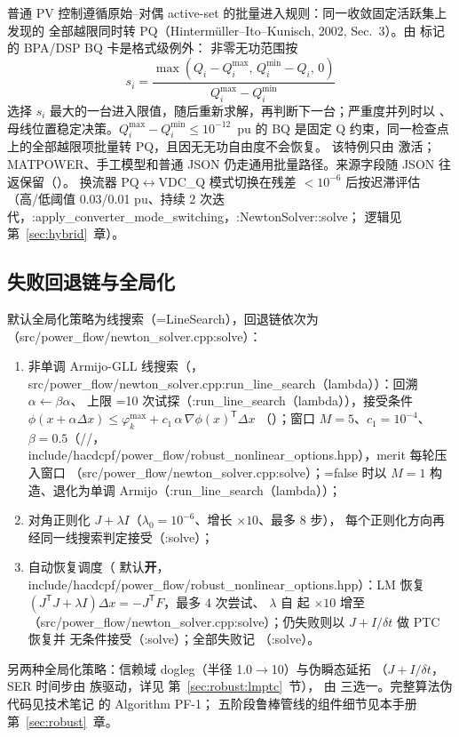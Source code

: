 普通 PV 控制遵循原始--对偶 active-set 的批量进入规则：同一收敛固定活跃集上发现的
全部越限同时转 PQ（Hinterm\"uller--Ito--Kunisch, 2002, Sec.~3）。由
 标记的 BPA/DSP BQ 卡是格式级例外：
非零无功范围按
\[
 s_i=\frac{\max(Q_i-Q_i^{\max},\,Q_i^{\min}-Q_i,\,0)}
 {Q_i^{\max}-Q_i^{\min}}
\]
选择 $s_i$ 最大的一台进入限值，随后重新求解，再判断下一台；严重度并列时以
、母线位置稳定决策。$Q_i^{\max}-Q_i^{\min}\le10^{-12}$~pu
的 BQ 是固定 Q 约束，同一检查点上的全部越限项批量转 PQ，且因无无功自由度不会恢复。
该特例只由  激活；MATPOWER、手工模型和普通 JSON
仍走通用批量路径。来源字段随 JSON 往返保留（）。
换流器 PQ$\leftrightarrow$VDC\_Q 模式切换在残差 $<10^{-6}$ 后按迟滞评估
（高/低阈值 0.03/0.01 pu、持续 2 次迭代，:apply\_converter\_mode\_switching，:NewtonSolver::solve；
逻辑见第~\ref{sec:hybrid}~章）。

\subsection{失败回退链与全局化}
默认全局化策略为线搜索（=LineSearch），回退链依次为
（src/power\_flow/newton\_solver.cpp:solve）：
\begin{enumerate}
  \item 非单调 Armijo-GLL 线搜索（，
        src/power\_flow/newton\_solver.cpp:run\_line\_search（lambda））：回溯 $\alpha\leftarrow\beta\alpha$、
        上限 =10 次试探（:run\_line\_search（lambda）），接受条件
        $\phi(x+\alpha\Delta x)\le\varphi_k^{\max}+c_1\,\alpha\,\nabla\phi(x)^{\mathsf T}\Delta x$
        （）；窗口 $M=5$、$c_1=10^{-4}$、
        $\beta=0.5$（//，
        include/hacdcpf/power\_flow/robust\_nonlinear\_options.hpp），merit 每轮压入窗口
        （src/power\_flow/newton\_solver.cpp:solve）；=false
        时以 $M=1$ 构造、退化为单调 Armijo（:run\_line\_search（lambda））；
  \item 对角正则化 $J+\lambda I$（$\lambda_0=10^{-6}$、增长 $\times10$、最多 8 步），
        每个正则化方向再经同一线搜索判定接受（:solve）；
  \item 自动恢复调度（ 默认\textbf{开}，
        include/hacdcpf/power\_flow/robust\_nonlinear\_options.hpp）：LM 恢复
        $(J^{\mathsf T}J+\lambda I)\Delta x=-J^{\mathsf T}F$，最多 4 次尝试、
        $\lambda$ 自  起 $\times10$ 增至 
        （src/power\_flow/newton\_solver.cpp:solve）；仍失败则以 $J+I/\delta t$ 做 PTC 恢复并
        无条件接受（:solve）；全部失败记 （:solve）。
\end{enumerate}
另两种全局化策略：信赖域 dogleg（半径 1.0$\to$10）与伪瞬态延拓
（$J+I/\delta t$，SER 时间步由  族驱动，详见
第~\ref{sec:robust:lmptc}~节），
由  三选一。完整算法伪代码见技术笔记
 的 Algorithm PF-1；
五阶段鲁棒管线的组件细节见本手册第~\ref{sec:robust}~章。

